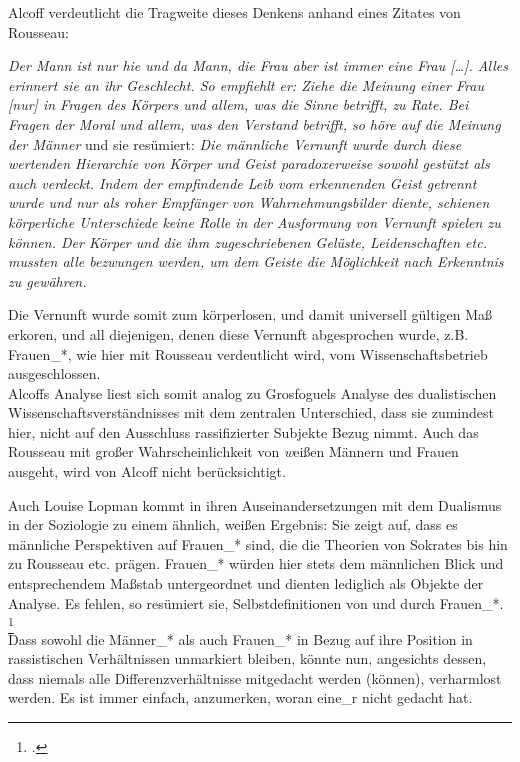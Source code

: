 Alcoff verdeutlicht die Tragweite dieses Denkens anhand eines Zitates von Rousseau:
\begin{myenv}
 \textit{
 \glqq Der Mann ist nur hie und da Mann, die Frau aber ist immer eine Frau
 […]. Alles erinnert sie an ihr Geschlecht. So empfiehlt er: Ziehe die Meinung
 einer Frau [nur] in Fragen des Körpers und allem, was die Sinne betrifft, zu
 Rate. Bei Fragen der Moral und allem, was den Verstand betrifft, so höre auf
 die Meinung der Männer \grqq \footnotemark {}} und sie resümiert: \textit{ \glqq Die männliche Vernunft wurde
 durch diese wertenden Hierarchie von Körper und Geist paradoxerweise sowohl
 gestützt als auch verdeckt. Indem der empfindende Leib vom erkennenden Geist
 getrennt wurde und nur als roher Empfänger von Wahrnehmungsbilder diente,
 schienen körperliche Unterschiede keine Rolle in der Ausformung von Vernunft
 spielen zu können. Der Körper und die ihm zugeschriebenen Gelüste,
 Leidenschaften etc. mussten alle bezwungen werden, um dem Geiste die
Möglichkeit nach Erkenntnis zu gewähren.\grqq \footnotemark {} } \end{myenv}


Die Vernunft wurde somit zum körperlosen, und damit universell gültigen Maß
erkoren, und all diejenigen, denen diese Vernunft abgesprochen wurde, z.B.
Frauen\_*, wie hier mit Rousseau verdeutlicht wird, vom Wissenschaftsbetrieb
ausgeschlossen. \\
Alcoffs Analyse liest sich somit analog zu Grosfoguels Analyse
des dualistischen Wissenschaftsverständnisses mit dem zentralen Unterschied,
dass sie zumindest hier, nicht auf den Ausschluss rassifizierter Subjekte Bezug
nimmt. Auch das Rousseau mit großer Wahrscheinlichkeit von \textit{w}eißen Männern und
Frauen ausgeht, wird von Alcoff nicht berücksichtigt. 

Auch Louise Lopman kommt in
ihren Auseinandersetzungen mit dem Dualismus in der Soziologie zu einem
ähnlich, weißen Ergebnis: Sie zeigt auf, dass es männliche Perspektiven auf
Frauen\_* sind, die die Theorien von Sokrates bis hin zu Rousseau etc. prägen.
Frauen\_* würden hier stets dem männlichen Blick und entsprechendem Maßstab
untergeordnet und dienten lediglich als Objekte der Analyse. Es fehlen, so
resümiert sie, Selbstdefinitionen von und durch Frauen\_*. \footnotemark
\footcitetext{lopman} \\
Dass sowohl die
Männer\_* als auch Frauen\_* in Bezug auf ihre Position in rassistischen
Verhältnissen unmarkiert bleiben, könnte nun, angesichts dessen, dass niemals
alle Differenzverhältnisse mitgedacht werden (können), verharmlost werden. Es
ist immer einfach, anzumerken, woran eine\_r nicht gedacht hat.

